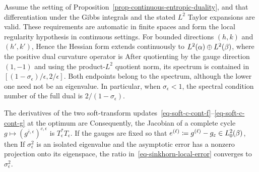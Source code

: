 \begin{prop}\label{prop-sinkhorn-local-rate}
	Assume the setting of Proposition~\ref{prop-continuous-entropic-duality}, and that differentiation under the Gibbs integrals and the stated $L^2$ Taylor expansions are valid. These requirements are automatic in finite spaces and form the local regularity hypothesis in continuous settings. For bounded directions $(h,k)$ and $(h',k')$,
	Hence the Hessian form extends continuously to
	\(L^2(\alpha)\oplus L^2(\beta)\), where the positive dual curvature operator is
	After quotienting by the gauge direction $(1,-1)$ and using the product-$L^2$ quotient norm, its spectrum is contained in $[(1-\sigma_\epsilon)/\epsilon,2/\epsilon]$.
	Both endpoints belong to the spectrum, although the lower one need not be an eigenvalue.
	In particular, when $\sigma_\epsilon<1$, the spectral condition number of the full dual is \(2/(1-\sigma_\epsilon)\).

	The derivatives of the two soft-transform updates~\eqref{eq-soft-c-cont-f}--\eqref{eq-soft-c-cont-g} at the optimum are
	Consequently, the Jacobian of a complete cycle
	\(g\mapsto(g^{\bar c,\epsilon})^{c,\epsilon}\)
	is $T_\epsilon^*T_\epsilon$. If the gauges are fixed so that
	\(e^{(\ell)}\coloneqq g^{(\ell)}-g_\varepsilon\in L_0^2(\beta)\), then
	If $\sigma_\epsilon^2$ is an isolated eigenvalue and the asymptotic error has a nonzero projection onto its eigenspace, the ratio in~\eqref{eq-sinkhorn-local-error} converges to $\sigma_\epsilon^2$.
\end{prop}

